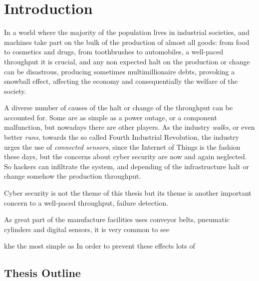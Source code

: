 
\chapter{Introduction}
In a world where the majority of the population lives in industrial societies,
and machines take part on the bulk of the production of almost all goods: from
food to cosmetics and drugs, from toothbrushes to automobiles, 
a well-paced throughput it is crucial, and any non expected halt on the
production or change can be disastrous, producing sometimes multimillionaire debts,
provoking a snowball effect, affecting the economy and consequentially the welfare of the society.

A diverse number of causes of the halt or change of the throughput can be
accounted for. Some are as simple as a power outage, or a component malfunction,
but nowadays there are other players. As the industry \textsl{walks}, or even
better \textsl{runs}, towards the so called Fourth Industrial Revolution, the industry
urges the use of \textit{connected sensors}, since the Internet of Things is the
fashion these days, but the concerns about cyber security are now and again neglected.   
So hackers can infiltrate the system, and depending of the infrastructure
halt or change somehow the production throughput.

Cyber security is not the theme of this thesis but its theme is another important concern to a
well-paced throughput, failure detection.

As great part of the manufacture facilities uses conveyor
belts, pneumatic cylinders and digital sensors, it is very common to see \PLCs



\PLC 




\oi





khe  the most simple as  In order to prevent these effects lots of 
\section{Thesis Outline}
\label{sec:thesisOutline}






